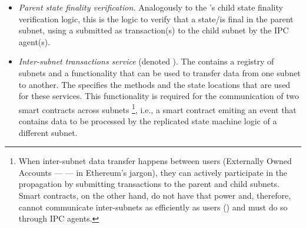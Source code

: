 \begin{itemize}
\begin{enumerate}
        \begin{itemize}
            \item \emph{Parent state finality verification.} Analogously to the \sa's child state finality verification logic,
            this is the logic to verify that a state/\tx is final in the parent subnet,
            using a \pof submitted as transaction(s) to the child subnet by the IPC agent(s).
            \item \emph{Inter-subnet transactions service} (denoted \postoffice).
            The \gw contains a registry of subnets and a functionality that can be used to transfer data from one subnet to another. 
            The \postoffice specifies the methods and the state locations that are used for these services.
            This functionality is required for the communication of two smart contracts across subnets%
\footnote{When inter-subnet data transfer happens between users (Externally Owned Accounts --- \eoa --- in Ethereum's jargon), they can actively participate in the propagation by submitting transactions to the parent and child subnets. Smart contracts, on the other hand, do not have that power and, therefore, cannot communicate inter-subnets as efficiently as users (\eoa) and must do so through IPC agents.},
            i.e., a smart contract emiting an event that contains data to be processed by the replicated state machine logic of a different subnet.
        \end{itemize}
    \end{enumerate}
\end{itemize}

